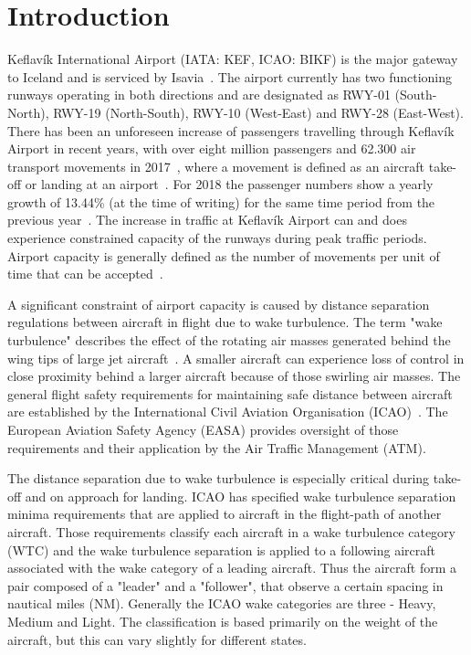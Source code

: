 \chapter{Introduction\label{cha:introduction}}

Keflavík International Airport (IATA: KEF, ICAO: BIKF) is the major gateway to Iceland and is serviced by Isavia~\cite{Isavia_about}. The airport currently has two functioning runways operating in both directions and are designated as RWY-01 (South-North), RWY-19 (North-South), RWY-10 (West-East) and RWY-28 (East-West). 
There has been an unforeseen increase of passengers travelling through Keflavík Airport in recent years, with over eight million passengers and 62.300 air transport movements in 2017~\cite{isavia_facts_2017}, where a movement is defined as an aircraft take-off or landing at an airport~\cite{aircraft_movement}. For 2018 the passenger numbers show a yearly growth of 13.44\% (at the time of writing) for the same time period from the previous year~\cite{isavia_pass_statistics_2018}. The increase in traffic at Keflavík Airport can and does experience constrained capacity of the runways during peak traffic periods. Airport capacity is generally defined as the number of movements per unit of time that can be accepted~\cite{airport_capacity_methodology}.  

A significant constraint of airport capacity is caused by distance separation regulations between aircraft in flight due to wake turbulence. The term "wake turbulence" describes the effect of the rotating air masses generated behind the wing tips of large jet aircraft~\cite{doc4444full}. A smaller aircraft can experience loss of control in close proximity behind a larger aircraft because of those swirling air masses. The general flight safety requirements for maintaining safe distance between aircraft are established by the International Civil Aviation Organisation (ICAO)~\cite{doc4444full}. The European Aviation Safety Agency (EASA) provides oversight of those requirements and their application by the Air Traffic Management (ATM). 

The distance separation due to wake turbulence is especially critical during take-off and on approach for landing. ICAO has specified wake turbulence separation minima requirements that are applied to aircraft in the flight-path of another aircraft. Those requirements classify each aircraft in a wake turbulence category (WTC) and the wake turbulence separation is applied to a following aircraft associated with the wake category of a leading aircraft. Thus the aircraft form a pair composed of a "leader" and a "follower", that observe a certain spacing in nautical miles (NM). Generally the ICAO wake categories are three - Heavy, Medium and Light. The classification is based primarily on the weight of the aircraft, but this can vary slightly for different states.

